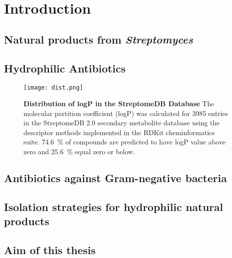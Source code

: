 \chapter{Introduction}

\section{Natural products from \textit{Streptomyces}} %
\label{sec:natural_products_from_it}


\section{Hydrophilic Antibiotics} %
\label{sec:hydrophilic_antibiotics}

\begin{figure}[htbp]
	\centering
	\texttt{[image: dist.png]}
	\caption[Distribution of logP in the StreptomeDB Database]{%
		\textbf{Distribution of logP in the StreptomeDB Database}
		The molecular partition coefficient (logP) was calculated for 3985 entries in the StreptomeDB 2.0 secondary metabolite database\autocite{Klementz2016} using the descriptor methods implemented in the RDKit cheminformatics suite\autocite{Wildman1999}.
		74.6~\%  of compounds are predicted to have logP value above zero and 25.6~\% equal zero or below.
	}
	\label{fig:}
\end{figure}


\section{Antibiotics against Gram-negative bacteria} %
\label{sec:antibiotics_against_gram_negative_bacteria}


\section{Isolation strategies for hydrophilic natural products} %
\label{sec:isolation_strategies_for_hydrophilic_natural_products}


\section{Aim of this thesis} %
\label{sec:aim_of_this_thesis}

